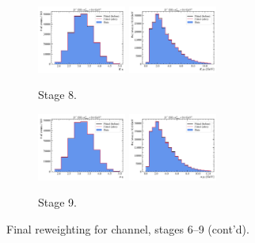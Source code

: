 \begin{figure}[htb]
    \begin{subfigure}{\textwidth}
        \centering
        \includegraphics[width=0.32\textwidth]{./figs-mc-correction/reweighting-final/plot_step7-Dst_iso-k_eta.pdf}
        \includegraphics[width=0.32\textwidth]{./figs-mc-correction/reweighting-final/plot_step7-Dst_iso-k_pt.pdf}
        \caption{Stage 8.}
    \end{subfigure}

    \begin{subfigure}{\textwidth}
        \centering
        \includegraphics[width=0.32\textwidth]{./figs-mc-correction/reweighting-final/plot_step8-Dst_iso-pi_eta.pdf}
        \includegraphics[width=0.32\textwidth]{./figs-mc-correction/reweighting-final/plot_step8-Dst_iso-pi_pt.pdf}
        \caption{Stage 9.}
    \end{subfigure}

    \caption{Final reweighting for \Dstar channel, stages 6--9 (cont'd).}
    \label{fig:final-rwt-dst-idx2}
\end{figure}

